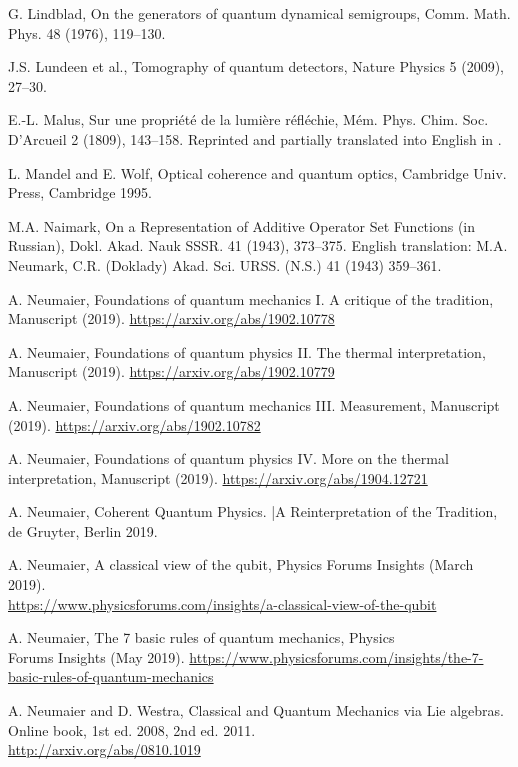 \documentclass[12pt]{article}
\begin{document}
\begin{thebibliography}{99}
 G. Lindblad,
On the generators of quantum dynamical semigroups,
Comm. Math. Phys. 48 (1976), 119--130.

 J.S. Lundeen et al.,
Tomography of quantum detectors,
Nature Physics 5 (2009), 27--30.

 E.-L. Malus,
Sur une propri\'et\'e de la lumi\`ere r\'efl\'echie,
M\'em. Phys. Chim. Soc. D'Arcueil 2 (1809), 143--158.
Reprinted and partially translated into English in \cite{Swi}.

 L. Mandel and E. Wolf,
Optical coherence and quantum optics,
Cambridge Univ. Press, Cambridge 1995.

 M.A. Naimark,
On a Representation of Additive Operator Set Functions (in Russian),
Dokl. Akad. Nauk SSSR. 41 (1943), 373--375.
English translation: M.A. Neumark,
C.R. (Doklady) Akad. Sci. URSS. (N.S.) 41 (1943) 359--361.

 A. Neumaier,
Foundations of quantum mechanics I. A critique of the tradition,
Manuscript (2019).
\url{https://arxiv.org/abs/1902.10778}

 A. Neumaier,
Foundations of quantum physics II. The thermal interpretation,
Manuscript (2019).
\url{https://arxiv.org/abs/1902.10779}

 A. Neumaier,
Foundations of quantum mechanics III. Measurement,
Manuscript (2019).
\url{https://arxiv.org/abs/1902.10782}

 A. Neumaier,
Foundations of quantum physics IV. More on the thermal interpretation,
Manuscript (2019).
\url{https://arxiv.org/abs/1904.12721}

 A. Neumaier,
Coherent Quantum Physics. |A Reinterpretation of the Tradition,
de Gruyter, Berlin 2019.

 A. Neumaier,
A classical view of the qubit,
Physics Forums Insights (March 2019). \\
{\footnotesize\url{https://www.physicsforums.com/insights/a-classical-view-of-the-qubit}}

 A. Neumaier,
The 7 basic rules of quantum mechanics,
Physics \\
Forums Insights (May 2019).
\url{https://www.physicsforums.com/insights/the-7-basic-rules-of-quantum-mechanics}

 A. Neumaier and D. Westra,
Classical and Quantum Mechanics via Lie algebras.
Online book, 1st ed. 2008, 2nd ed. 2011.\\
\url{http://arxiv.org/abs/0810.1019}


\end{thebibliography}
\end{document}
